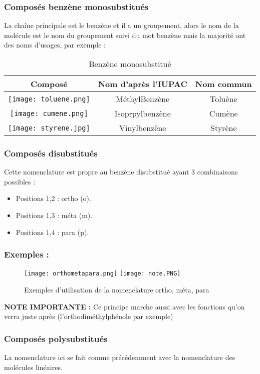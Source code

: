 \documentclass[a4paper, oneside]{book}
\begin{document}
\subsubsection{Composés benzène monosubstitués}
La chaîne principale est le benzène et il a un groupement, alors le nom de la molécule est le nom du groupement suivi du mot benzène mais la majorité ont des noms d'usages, par exemple :
\vspace{0.5cm}
\begin{table}[!h]
    \centering
    \begin{tabular}{|c|c|c|}
    \hline
    \textbf{Composé} & \textbf{Nom d'après l'IUPAC} &\textbf{Nom commun}  \\
    \hline
     \texttt{[image: toluene.png]} & MéthylBenzène & Toluène \\
     \hline
     \texttt{[image: cumene.png]} & Isoprpylbenzène & Cumène \\
     \hline
     \texttt{[image: styrene.jpg]} & Vinylbenzène & Styrène \\
     \hline
    \end{tabular} 
    \caption{Benzène monosubstitué}
    \label{tab:my_label}
\end{table}
\subsubsection{Composés disubstitués}
Cette nomenclature est propre au benzène disubstitué ayant 3 combinaisons possibles :
\begin{itemize}
    \item Positions 1,2 : ortho (o).
    \item Positions 1,3 : méta (m).
    \item Positions 1,4 : para (p).
\end{itemize}
\subsubsection{Exemples :}
\begin{figure}[ht]
    \centering
    \texttt{[image: orthometapara.png]}
    \texttt{[image: note.PNG]}
    \caption{Exemples d'utilisation de la nomenclature ortho, méta, para}
    \label{fig:my_label}
\end{figure}
\textbf{NOTE IMPORTANTE : } Ce principe marche aussi avec les fonctions qu'on verra juste après (l'orthodiméthylphénole par exemple)
\subsubsection{Composés polysubstitués}
La nomenclature ici se fait comme précédemment avec la nomenclature des molécules linéaires.
\end{document}
